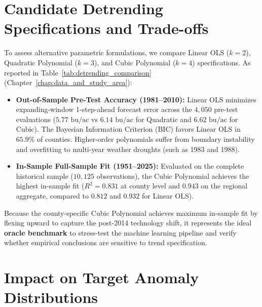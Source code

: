 
\section{Candidate Detrending Specifications and Trade-offs}
\label{sec:app_candidate_specs}

To assess alternative parametric formulations, we compare Linear OLS ($k=2$), Quadratic Polynomial ($k=3$), and Cubic Polynomial ($k=4$) specifications. As reported in Table~\ref{tab:detrending_comparison} (Chapter~\ref{chap:data_and_study_area}):
\begin{itemize}
    \item \textbf{Out-of-Sample Pre-Test Accuracy (1981--2010):} Linear OLS minimizes expanding-window 1-step-ahead forecast error across the $4{,}050$ pre-test evaluations ($5.77\text{ bu/ac}$ vs $6.14\text{ bu/ac}$ for Quadratic and $6.62\text{ bu/ac}$ for Cubic). The Bayesian Information Criterion (BIC) favors Linear OLS in $65.9\%$ of counties. Higher-order polynomials suffer from boundary instability and overfitting to multi-year weather droughts (such as 1983 and 1988).
    \item \textbf{In-Sample Full-Sample Fit (1951--2025):} Evaluated on the complete historical sample ($10{,}125$ observations), the Cubic Polynomial achieves the highest in-sample fit ($R^2 = 0.831$ at county level and $0.943$ on the regional aggregate, compared to $0.812$ and $0.932$ for Linear OLS).
\end{itemize}

Because the county-specific Cubic Polynomial achieves maximum in-sample fit by flexing upward to capture the post-2014 technology shift, it represents the ideal \textbf{oracle benchmark} to stress-test the machine learning pipeline and verify whether empirical conclusions are sensitive to trend specification.


\section{Impact on Target Anomaly Distributions}
\label{sec:app_distribution_impact}

